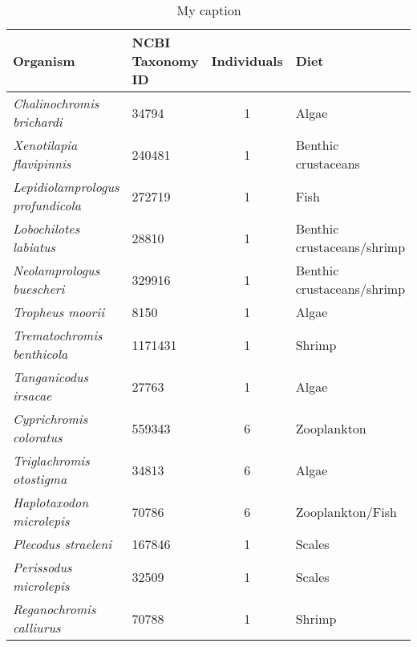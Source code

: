 \begin{table}[]
\centering
\begin{tabular}{@{}llcl@{}}
\toprule
\textbf{Organism} & \textbf{NCBI Taxonomy ID} & \textbf{Individuals} & \textbf{Diet} \\ \midrule
\textit{Chalinochromis brichardi} & 34794 & 1 & Algae \\
\textit{Xenotilapia flavipinnis} & 240481 & 1 & Benthic crustaceans \\
\textit{Lepidiolamprologus profundicola} & 272719 & 1 & Fish \\
\textit{Lobochilotes labiatus} & 28810 & 1 & Benthic crustaceans/shrimp \\
\textit{Neolamprologus buescheri} & 329916 & 1 & Benthic crustaceans/shrimp \\
\textit{Tropheus moorii} & 8150 & 1 & Algae \\
\textit{Trematochromis benthicola} & 1171431 & 1 & Shrimp \\
\textit{Tanganicodus irsacae} & 27763 & 1 & Algae \\
\textit{Cyprichromis coloratus} & 559343 & 6 & Zooplankton \\
\textit{Triglachromis otostigma} & 34813 & 6 & Algae \\
\textit{Haplotaxodon microlepis} & 70786 & 6 & Zooplankton/Fish \\
\textit{Plecodus straeleni} & 167846 & 1 & Scales \\
\textit{Perissodus microlepis} & 32509 & 1 & Scales \\
\textit{Reganochromis calliurus} & 70788 & 1 & Shrimp \\ \bottomrule
\end{tabular}
\caption{My caption}
\label{FP_table1}
\end{table}
